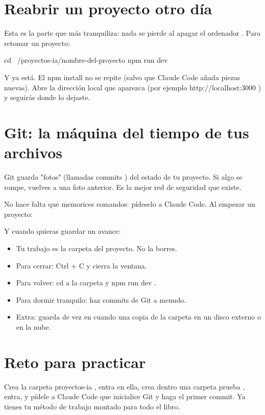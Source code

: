 \documentclass[11pt,a4paper]{book}
\begin{document}
\section{Reabrir un proyecto otro día}
Esta es la parte que más tranquiliza: nada se pierde al apagar el ordenador . Para retomar un proyecto:

\begin{codebox}
cd ~/proyectos-ia/nombre-del-proyecto
npm run dev
\end{codebox}
Y ya está. El npm install no se repite (salvo que Claude Code añada piezas nuevas). Abre la dirección local que aparezca (por ejemplo http://localhost:3000 ) y seguirás donde lo dejaste.

\section{Git: la máquina del tiempo de tus archivos}
Git guarda "fotos" (llamadas commits ) del estado de tu proyecto. Si algo se rompe, vuelves a una foto anterior. Es la mejor red de seguridad que existe.

No hace falta que memorices comandos: pídeselo a Claude Code. Al empezar un proyecto:

Y cuando quieras guardar un avance:

\begin{itemize}\item Tu trabajo es la carpeta del proyecto. No la borres.\end{itemize}
\begin{itemize}\item Para cerrar: Ctrl + C y cierra la ventana.\end{itemize}
\begin{itemize}\item Para volver: cd a la carpeta y npm run dev .\end{itemize}
\begin{itemize}\item Para dormir tranquilo: haz commits de Git a menudo.\end{itemize}
\begin{itemize}\item Extra: guarda de vez en cuando una copia de la carpeta en un disco externo o en la nube.\end{itemize}
\section{Reto para practicar}
Crea la carpeta proyectos-ia , entra en ella, crea dentro una carpeta prueba , entra, y pídele a Claude Code que inicialice Git y haga el primer commit. Ya tienes tu método de trabajo montado para todo el libro.
\end{document}
